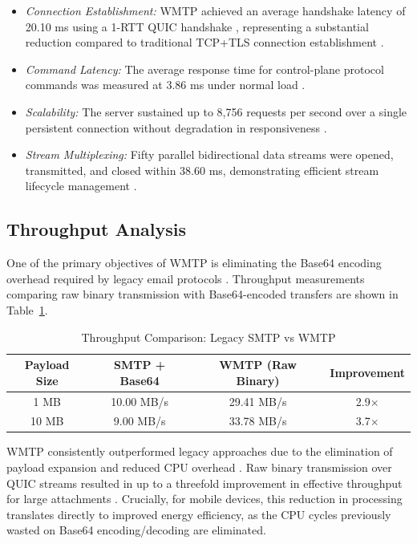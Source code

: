 \documentclass[10pt,a4paper]{article}
\begin{document}
\begin{itemize}
\item \textit{Connection Establishment:} WMTP achieved an
average handshake latency of 20.10 ms using a 1-RTT QUIC
handshake \cite{quic, tls13}, representing a substantial
reduction compared to traditional TCP+TLS connection
establishment \cite{smtp, tls13}.
\item \textit{Command Latency:} The average response time
for control-plane protocol commands was measured at
3.86 ms under normal load \cite{jmap}.
\item \textit{Scalability:} The server sustained up to
8,756 requests per second over a single persistent connection
without degradation in responsiveness \cite{rustasync}.
\item \textit{Stream Multiplexing:} Fifty parallel
bidirectional data streams were opened, transmitted, and
closed within 38.60 ms, demonstrating efficient stream
lifecycle management \cite{quic, webtransport}.
\end{itemize}

\subsection{Throughput Analysis}

One of the primary objectives of WMTP is eliminating the
Base64 encoding overhead required by legacy email
protocols \cite{base64, smtp, imap}. Throughput measurements
comparing raw binary transmission with Base64-encoded
transfers are shown in Table~\ref{tab:throughput}.

\begin{table}[H]
\caption{Throughput Comparison: Legacy SMTP vs WMTP}
\centering
\begin{tabular}{|c|c|c|c|}
\hline
\textbf{Payload Size} & \textbf{SMTP + Base64} & \textbf{WMTP (Raw Binary)} & \textbf{Improvement} \\
\hline
1 MB  & 10.00 MB/s & 29.41 MB/s & 2.9$\times$ \\
10 MB & 9.00 MB/s  & 33.78 MB/s & 3.7$\times$ \\
\hline
\end{tabular}
\label{tab:throughput}
\end{table}

WMTP consistently outperformed legacy approaches due to
the elimination of payload expansion and reduced CPU
overhead \cite{quic}. Raw binary transmission over QUIC
streams resulted in up to a threefold improvement in
effective throughput for large attachments \cite{gridfs2024}. Crucially, for mobile devices, this reduction in processing translates directly to improved energy efficiency, as the CPU cycles previously wasted on Base64 encoding/decoding are eliminated.
\end{document}
